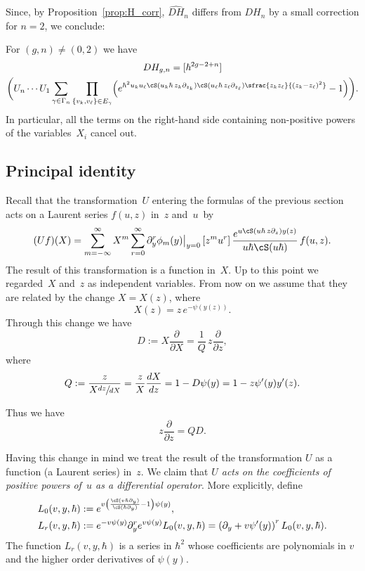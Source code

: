 Since, by Proposition~\ref{prop:H_corr}, $\widehat{DH}_n$ differs from $DH_n$ by a small correction for $n=2$, we conclude:

\begin{corollary}\label{cor:preDHgn}
For $(g,n)\ne(0,2)$ we have
\begin{multline}\label{eq:preDHgn}
DH_{g,n}=[\hbar^{2g-2+n}]\\
\biggl(U_n\cdots U_1
\sum_{\gamma \in \Gamma_n}\prod_{\{v_k,v_\ell\}\in E_\gamma}
\Bigl(e^{\hbar^2u_ku_\ell\cS(u_k\hbar\,z_k\partial_{z_k})\cS(u_\ell\hbar\,z_\ell \partial_{z_\ell})
\sfrac{z_k z_\ell}{(z_k-z_\ell)^2}}-1\Bigr)
\biggr).
\end{multline}
In particular, all the terms on the right-hand side containing non-positive powers of the variables~$X_i$ cancel out.
\end{corollary}

\subsection{Principal identity}\label{sec:princid}

Recall that the transformation~$U$ entering the formulas of the previous section acts on a Laurent series $f(u,z)$ in~$z$ and~$u$~by
\begin{equation*}
(U f)(X)=\sum_{m=-\infty}^\infty X^{m}\sum_{r=0}^\infty
\partial_y^{r}\phi_{m}(y)\big|_{y=0}\,[z^mu^r]\,
\frac{e^{ u\cS(u\hbar\,z\partial_z)y(z) }}{u\hbar\cS(u\hbar)}\,f(u,z).
\end{equation*}
The result of this transformation is a function in~$X$. Up to this point we regarded~$X$ and~$z$ as independent variables. From now on we assume that they are related by the change $X=X(z)$, where
\begin{equation}\label{eq:Xdef}
X(z)=z\,e^{-\psi(y(z))}.
\end{equation}
Through this change we have
\[
D:=X\frac{\partial}{\partial X}=\frac{1}{Q}\,z\frac{\partial}{\partial z},
\]
where
\[
Q:=\frac{z}{X\sfrac{dz}{dX}}=\frac{z}{X}\frac{dX}{dz}=1-D\psi(y)=1-z\psi'(y)y'(z).
\]

Thus we have
\begin{equation*}\label{eq:zdzQD}
z\dfrac{\partial}{\partial z} = QD.
\end{equation*}

Having this change in mind we treat the result of the transformation $U$ as a function (a Laurent series) in~$z$. We claim that \emph{$U$ acts on the coefficients of positive powers of~$u$ as a differential operator}. More explicitly, define
\begin{align}
L_0(v,y,\hbar)&:=e^{v\left(\frac{\cS(v\hbar\partial_y)}{\cS(\hbar\partial_y)}-1\right)\psi(y)},\notag\\ \label{eq:Lrdef}
L_r(v,y,\hbar)&:=e^{-v\psi(y)}\partial_y^re^{v\psi(y)}L_0(v,y,\hbar)
=\left(\partial_y+v\psi'(y)\right)^rL_0(v,y,\hbar).
\end{align}
The function $L_r(v,y,\hbar)$ is a series in $\hbar^2$ whose coefficients are polynomials in $v$ and the higher order derivatives of $\psi(y)$.

